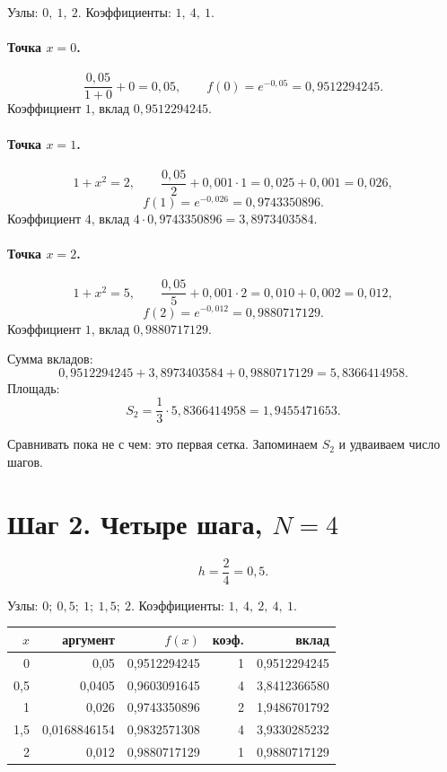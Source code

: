 \documentclass[11pt,a4paper]{article}
\begin{document}
Узлы: \(0,\ 1,\ 2\). Коэффициенты: \(1,\ 4,\ 1\).

\paragraph{Точка \(x = 0\).}
\[
\frac{0{,}05}{1 + 0} + 0 = 0{,}05,
\qquad
f(0) = e^{-0{,}05} = 0{,}9512294245.
\]
Коэффициент \(1\), вклад \(0{,}9512294245\).

\paragraph{Точка \(x = 1\).}
\[
1 + x^{2} = 2,
\qquad
\frac{0{,}05}{2} + 0{,}001\cdot 1 = 0{,}025 + 0{,}001 = 0{,}026,
\]
\[
f(1) = e^{-0{,}026} = 0{,}9743350896.
\]
Коэффициент \(4\), вклад \(4\cdot 0{,}9743350896 = 3{,}8973403584\).

\paragraph{Точка \(x = 2\).}
\[
1 + x^{2} = 5,
\qquad
\frac{0{,}05}{5} + 0{,}001\cdot 2 = 0{,}010 + 0{,}002 = 0{,}012,
\]
\[
f(2) = e^{-0{,}012} = 0{,}9880717129.
\]
Коэффициент \(1\), вклад \(0{,}9880717129\).

Сумма вкладов:
\[
0{,}9512294245 + 3{,}8973403584 + 0{,}9880717129 = 5{,}8366414958.
\]
Площадь:
\[
S_{2} = \frac{1}{3}\cdot 5{,}8366414958 = 1{,}9455471653.
\]

Сравнивать пока не с чем: это первая сетка. Запоминаем \(S_{2}\) и удваиваем число шагов.

\section*{Шаг 2. Четыре шага, \(N = 4\)}

\[
h = \frac{2}{4} = 0{,}5.
\]

Узлы: \(0;\ 0{,}5;\ 1;\ 1{,}5;\ 2\). Коэффициенты: \(1,\ 4,\ 2,\ 4,\ 1\).

{\small
\begin{center}
\begin{tabular}{@{}r r r r r@{}}
\toprule
\(x\) & аргумент & \(f(x)\) & коэф. & вклад \\
\midrule
0    & 0,05       & 0,9512294245 & 1 & 0,9512294245 \\
0,5  & 0,0405     & 0,9603091645 & 4 & 3,8412366580 \\
1    & 0,026      & 0,9743350896 & 2 & 1,9486701792 \\
1,5  & 0,0168846154 & 0,9832571308 & 4 & 3,9330285232 \\
2    & 0,012      & 0,9880717129 & 1 & 0,9880717129 \\
\bottomrule
\end{tabular}
\end{center}
}
\end{document}
